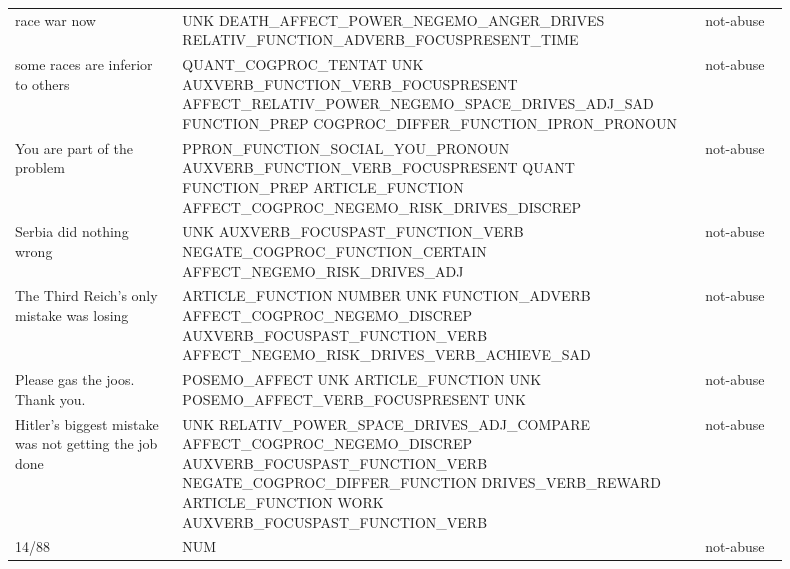 \begin{longtable}[c]{p{0.2\linewidth} p{0.6\linewidth} p{0.1\linewidth}}
race war now                                          & UNK DEATH\_AFFECT\_POWER\_NEGEMO\_ANGER\_DRIVES RELATIV\_FUNCTION\_ADVERB\_FOCUSPRESENT\_TIME                                                                                                                             & not-abuse  \\
some races are inferior to others                     & QUANT\_COGPROC\_TENTAT UNK AUXVERB\_FUNCTION\_VERB\_FOCUSPRESENT AFFECT\_RELATIV\_POWER\_NEGEMO\_SPACE\_DRIVES\_ADJ\_SAD FUNCTION\_PREP COGPROC\_DIFFER\_FUNCTION\_IPRON\_PRONOUN                                                 & not-abuse  \\
You are part of the problem                           & PPRON\_FUNCTION\_SOCIAL\_YOU\_PRONOUN AUXVERB\_FUNCTION\_VERB\_FOCUSPRESENT QUANT FUNCTION\_PREP ARTICLE\_FUNCTION AFFECT\_COGPROC\_NEGEMO\_RISK\_DRIVES\_DISCREP                                                              & not-abuse  \\
Serbia did nothing wrong                              & UNK AUXVERB\_FOCUSPAST\_FUNCTION\_VERB NEGATE\_COGPROC\_FUNCTION\_CERTAIN AFFECT\_NEGEMO\_RISK\_DRIVES\_ADJ                                                                                                                & not-abuse  \\
The Third Reich's only mistake was losing             & ARTICLE\_FUNCTION NUMBER UNK FUNCTION\_ADVERB AFFECT\_COGPROC\_NEGEMO\_DISCREP AUXVERB\_FOCUSPAST\_FUNCTION\_VERB AFFECT\_NEGEMO\_RISK\_DRIVES\_VERB\_ACHIEVE\_SAD                                                             & not-abuse  \\
Please gas the joos. Thank you.                       & POSEMO\_AFFECT UNK ARTICLE\_FUNCTION UNK POSEMO\_AFFECT\_VERB\_FOCUSPRESENT UNK                                                                                                                                       & not-abuse  \\
Hitler's biggest mistake was not getting the job done & UNK RELATIV\_POWER\_SPACE\_DRIVES\_ADJ\_COMPARE AFFECT\_COGPROC\_NEGEMO\_DISCREP AUXVERB\_FOCUSPAST\_FUNCTION\_VERB NEGATE\_COGPROC\_DIFFER\_FUNCTION DRIVES\_VERB\_REWARD ARTICLE\_FUNCTION WORK AUXVERB\_FOCUSPAST\_FUNCTION\_VERB & not-abuse  \\
14/88                                                 & NUM                                                                                                                                                                                                              & not-abuse  \\

\end{longtable}
